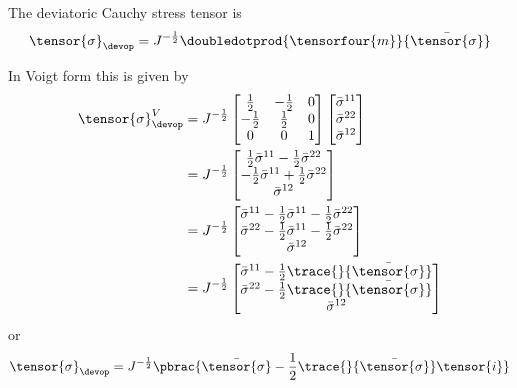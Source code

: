 The deviatoric Cauchy stress tensor is
\begin{equation}
  \tensor{\sigma}_{\devop}=J^{-\frac{1}{2}}\doubledotprod{\tensorfour{m}}{\bar{\tensor{\sigma}}}
\end{equation}

In Voigt form this is given by
\begin{equation}
  \begin{split}
    \tensor{\sigma}_{\devop}^{V}&=J^{-\frac{1}{2}}\begin{bmatrix}
      \frac{1}{2} & -\frac{1}{2} & 0 \\
      -\frac{1}{2} & \frac{1}{2} & 0 \\
      0 & 0 & 1
    \end{bmatrix}\begin{bmatrix}
      \bar{\sigma}^{11} \\
      \bar{\sigma}^{22} \\
      \bar{\sigma}^{12}
    \end{bmatrix} \\
    &=J^{-\frac{1}{2}}\begin{bmatrix}
    \frac{1}{2}\bar{\sigma}^{11}-\frac{1}{2}\bar{\sigma}^{22} \\
    -\frac{1}{2}\bar{\sigma}^{11}+\frac{1}{2}\bar{\sigma}^{22} \\
    \bar{\sigma}^{12}
    \end{bmatrix}\\
    &=J^{-\frac{1}{2}}\begin{bmatrix}
    \bar{\sigma}^{11}-\frac{1}{2}\bar{\sigma}^{11}-\frac{1}{2}\bar{\sigma}^{22} \\
    \bar{\sigma}^{22}-\frac{1}{2}\bar{\sigma}^{11}-\frac{1}{2}\bar{\sigma}^{22} \\
    \bar{\sigma}^{12}
    \end{bmatrix}\\
    &=J^{-\frac{1}{2}}\begin{bmatrix}
    \bar{\sigma}^{11}-\frac{1}{2}\trace{}{\bar{\tensor{\sigma}}} \\
    \bar{\sigma}^{22}-\frac{1}{2}\trace{}{\bar{\tensor{\sigma}}}\\
    \bar{\sigma}^{12}
    \end{bmatrix}
  \end{split}
\end{equation}
or
\begin{equation}
  \tensor{\sigma}_{\devop}=J^{-\frac{1}{2}}\pbrac{\bar{\tensor{\sigma}}-\frac{1}{2}\trace{}{\bar{\tensor{\sigma}}}\tensor{i}}
\end{equation}

